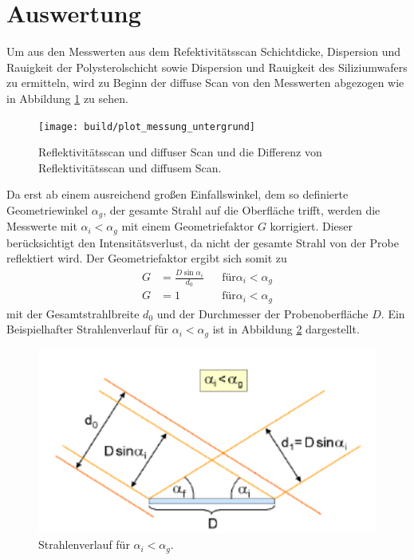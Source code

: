 \newpage
\section{Auswertung}
\label{sec:Auswertung}
Um aus den Messwerten aus dem Refektivitätsscan Schichtdicke, Dispersion
und Rauigkeit der Polysterolschicht sowie Dispersion und Rauigkeit des Siliziumwafers
zu ermitteln, wird
zu Beginn der diffuse Scan von den Messwerten abgezogen wie in Abbildung
\ref{fig:diffuse_Scan} zu sehen.

\begin{figure}
  \centering
  \texttt{[image: build/plot\_messung\_untergrund]}
  \caption{Reflektivitätsscan und diffuser Scan und die Differenz von Reflektivitätsscan und diffusem Scan.}
  \label{fig:diffuse_Scan}
\end{figure}

Da erst ab einem ausreichend großen Einfallswinkel,
dem so definierte Geometriewinkel $\alpha_g$,
der gesamte Strahl auf die Oberfläche trifft,
werden die Messwerte mit $\alpha_i < \alpha_g$
mit einem Geometriefaktor $G$ korrigiert.
Dieser berücksichtigt den Intensitätsverlust, da
nicht der gesamte Strahl von der Probe reflektiert wird.
Der Geometriefaktor ergibt sich somit zu
\begin{align}
G&=\frac{D\sin\alpha_i}{d_0} &  &\text{für} \alpha_i<\alpha_g \label{eqn:GEO}\\
G&=1 & &\text{für} \alpha_i<\alpha_g
\end{align}
mit der Gesamtstrahlbreite $d_0$ und der Durchmesser der Probenoberfläche $D$.
Ein Beispielhafter Strahlenverlauf für $\alpha_i<\alpha_g$ ist in Abbildung \ref{fig:geo}
dargestellt.
\begin{figure}
  \centering
  \includegraphics{bilder/geo_winkel.PNG}
  \caption{Strahlenverlauf für $\alpha_i<\alpha_g$. \cite{sample}}
  \label{fig:geo}
\end{figure}

